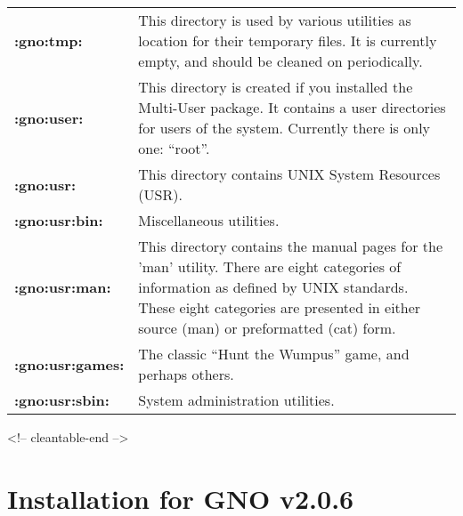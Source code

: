 \documentclass{report}
\begin{document}
\begin{tabular}{ll}
\bf :gno:tmp: \rm	& 
\begin{minipage}[t]{8cm}
	This directory is used by various utilities as location for
	their temporary files.  It is currently empty, and should
	be cleaned on periodically.
\end{minipage} \hfill \\

\bf :gno:user: \rm	& 
\begin{minipage}[t]{8cm}
	This directory is created if you installed the Multi-User package.
	It contains a user directories for users of the system.
	Currently there is only one: ``root''. 
\end{minipage} \hfill \\

\bf :gno:usr: \rm	& 
\begin{minipage}[t]{8cm}
	This directory contains UNIX System Resources (USR).
\end{minipage} \hfill \\

\bf :gno:usr:bin: \rm	& 
\begin{minipage}[t]{8cm}
	Miscellaneous utilities.
\end{minipage} \hfill \\

\bf :gno:usr:man: \rm	& 
\begin{minipage}[t]{8cm}
	This directory contains the manual pages for the 'man' utility.
	There are eight categories of information as defined by UNIX
	standards. These eight categories are presented in either
	source (man) or preformatted (cat) form.
\end{minipage} \hfill \\

\bf :gno:usr:games: \rm	& 
\begin{minipage}[t]{8cm}
	The classic ``Hunt the Wumpus'' game, and perhaps others.
\end{minipage} \hfill \\

\bf :gno:usr:sbin: \rm	& 
\begin{minipage}[t]{8cm}
	System administration utilities.
\end{minipage} \hfill \\

\end{tabular}
\begin{rawhtml}
<!-- cleantable-end -->
\end{rawhtml}

\chapter{Installation for GNO v2.0.6}
\end{document}
